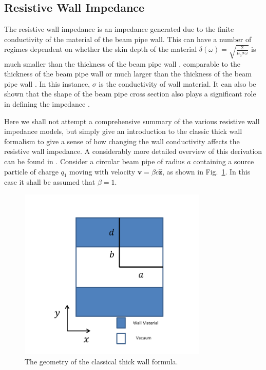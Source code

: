 \subsection{Resistive Wall Impedance}
\label{sec:res_wall_imp}

The resistive wall impedance is an impedance generated due to the finite conductivity of the material of the beam pipe wall. This can have a number of regimes dependent on whether the skin depth of the material $\delta \left( \omega \right) = \sqrt{\frac{2}{\mu_{0} \sigma \omega}}$ is much smaller than the thickness of the beam pipe wall \cite{Chao:PhysColEff}, comparable to the thickness of the beam pipe wall \cite{Roncarolo:ColImpMeas, Métral:ResWallWideFreq} or much larger than the thickness of the beam pipe wall \cite{Tsutsui:ferrKickLong, Biancacci:MMFiniteInsert}. In this instance, $\sigma$ is the conductivity of wall material. It can also be shown that the shape of the beam pipe cross section also plays a significant role in defining the impedance \cite{Mounet:Axisymmetric, Mounet:Flat}.

Here we shall not attempt a comprehensive summary of the various resistive wall impedance models, but simply give an introduction to the classic thick wall formalism to give a sense of how changing the wall conductivity affects the resistive wall impedance. A considerably more detailed overview of this derivation can be found in \cite{Chao:PhysColEff}. Consider a circular beam pipe of radius $a$ containing a source particle of charge $q_{1}$ moving with velocity $\mathbf{v} = \beta c \mathbf{\hat{z}}$, as shown in Fig.~\ref{fig:res_wall_diagram}. In this case it shall be assumed that $\beta = 1$.

\begin{figure}
\begin{center}
\includegraphics[width=0.8\textwidth]{Wakefields_and_Impedances/figures/reWallGeo.pdf}
\end{center}
\caption{The geometry of the classical thick wall formula.}
\label{fig:res_wall_diagram}
\end{figure}

